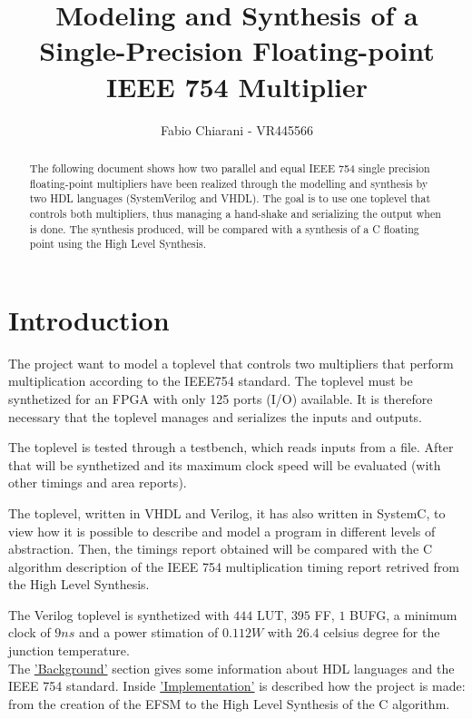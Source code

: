 \documentclass[]{IEEEtran}
\title{Modeling and Synthesis of a Single-Precision Floating-point IEEE 754 Multiplier}
\author{Fabio Chiarani - VR445566}
\begin{document}
	\maketitle
	
	\begin{abstract}
		The following document shows how two parallel and equal IEEE 754 single precision floating-point multipliers have been realized through the modelling and synthesis by two HDL languages (SystemVerilog and VHDL). The goal is to use one toplevel that controls both multipliers, thus managing a hand-shake and serializing the output when is done. The synthesis produced, will be compared with a synthesis of a C floating point using the High Level Synthesis.
	\end{abstract}
	
	
	\section{Introduction}
	
	The project want to model a toplevel that controls two multipliers that perform multiplication according to the IEEE754 standard. The toplevel must be synthetized for an FPGA with only 125 ports (I/O) available. It is therefore necessary that the toplevel manages and serializes the inputs and outputs. 
	
	The toplevel is tested through a testbench, which reads inputs from a file. After that will be synthetized and its maximum clock speed will be evaluated (with other timings and area reports).
	
	The toplevel, written in VHDL and Verilog, it has also written in SystemC, to view how it is possible to describe and model a program in different levels of abstraction. Then, the timings report obtained will be compared with the C algorithm description of the IEEE 754 multiplication timing report retrived from the High Level Synthesis.
	
		The Verilog toplevel is synthetized with $444$ LUT, $395$ FF, $1$ BUFG, a minimum clock of $9ns$ and a power stimation of $0.112W$ with $26.4$ celsius degree for the junction temperature.
	\\
	
	The \hyperref[sec:Background]{'Background'} section gives some information about HDL languages and the IEEE 754 standard.
	Inside \hyperref[sec:impl]{'Implementation'} is described how the project is made: from the creation of the EFSM to the High Level Synthesis of the C algorithm. 
	
\end{document}
